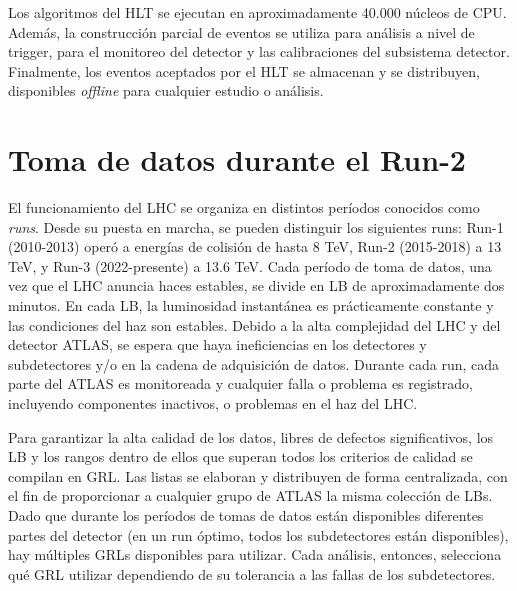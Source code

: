 Los algoritmos del \ac{HLT} se ejecutan en aproximadamente 40.000 núcleos de CPU. Además, la construcción parcial de eventos se utiliza para análisis a nivel de trigger, para el monitoreo del detector y las calibraciones del subsistema detector. Finalmente, los eventos aceptados por el \ac{HLT} se almacenan y se distribuyen, disponibles \textit{offline} para cualquier estudio o análisis.






\FloatBarrier
\section{Toma de datos durante el Run-2}
\label{sec:atlas:runs}


El funcionamiento del \ac{LHC} se organiza en distintos períodos conocidos como \textit{runs}.
Desde su puesta en marcha, se pueden distinguir los siguientes runs: Run-1 (2010-2013) operó a energías de colisión de hasta 8 TeV, Run-2 (2015-2018) a 13 TeV, y Run-3 (2022-presente) a 13.6 TeV. Cada período de toma de datos, una vez que el \ac{LHC} anuncia haces estables, se divide en \ac{LB} de aproximadamente dos minutos. En cada \ac{LB}, la luminosidad instantánea es prácticamente constante y las condiciones del haz son estables. Debido a la alta complejidad del \ac{LHC} y del detector \ac{ATLAS}, se espera que haya ineficiencias en los detectores y subdetectores y/o en la cadena de adquisición de datos. Durante cada run, cada parte del \ac{ATLAS} es monitoreada y cualquier falla o problema es registrado, incluyendo componentes inactivos, o problemas en el haz del \ac{LHC}.

Para garantizar la alta calidad de los datos, libres de defectos significativos, los \ac{LB} y los rangos dentro de ellos que superan todos los criterios de calidad se compilan en \ac{GRL}. Las listas se elaboran y distribuyen de forma centralizada, con el fin de proporcionar a cualquier grupo de \ac{ATLAS} la misma colección de \acp{LB}. Dado que durante los períodos de tomas de datos están disponibles diferentes partes del detector (en un run óptimo, todos los subdetectores están disponibles), hay múltiples \acp{GRL} disponibles para utilizar. Cada análisis, entonces, selecciona qué \ac{GRL} utilizar dependiendo de su tolerancia a las fallas de los subdetectores.

